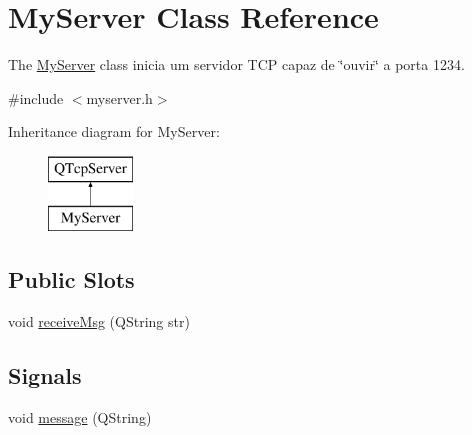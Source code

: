 \hypertarget{class_my_server}{}\section{My\+Server Class Reference}
\label{class_my_server}


The \mbox{\hyperlink{class_my_server}{My\+Server}} class inicia um servidor T\+CP capaz de \char`\"{}ouvir\char`\"{} a porta 1234.  




{\ttfamily \#include $<$myserver.\+h$>$}

Inheritance diagram for My\+Server\+:\begin{figure}[H]
\begin{center}
\leavevmode
\includegraphics[height=2.000000cm]{class_my_server}
\end{center}
\end{figure}
\subsection*{Public Slots}
\begin{DoxyCompactItemize}
\item 
void \mbox{\hyperlink{class_my_server_ac795ee6f1607c0fa4e635a0da2bf2164}{receive\+Msg}} (Q\+String str)
\end{DoxyCompactItemize}
\subsection*{Signals}
\begin{DoxyCompactItemize}
\item 
void \mbox{\hyperlink{class_my_server_a2b884bce37840b1b461363a37b463b30}{message}} (Q\+String)
\end{DoxyCompactItemize}
